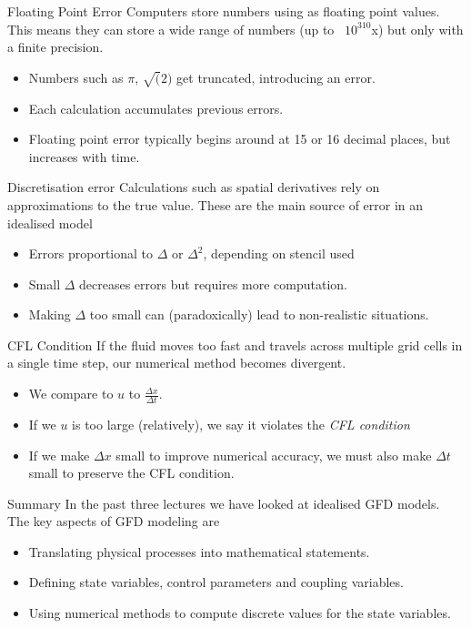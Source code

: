 \documentclass[a4paper]{beamer}
\begin{document}
\begin{frame}{Floating Point Error}
Computers store numbers using as floating point values. This means they can store a wide range of numbers (up to ~$10^310$x) but only with a finite precision.
\begin{itemize}
\item Numbers such as $\pi$, $\sqrt(2)$ get truncated, introducing an error.
\item Each calculation accumulates previous errors.
\item Floating point error typically begins around at 15 or 16 decimal places, but increases with time.
\end{itemize}
\end{frame}

\begin{frame}{Discretisation error}
Calculations such as spatial derivatives rely on approximations to the true value.
These are the main source of error in an idealised model
\begin{itemize}
\item Errors proportional to $\Delta$ or $\Delta^2$, depending on stencil used
\item Small $\Delta$ decreases errors but requires more computation.
\item Making $\Delta$ too small can (paradoxically) lead to non-realistic situations.
\end{itemize}
\end{frame}

\begin{frame}{CFL Condition}
If the fluid moves too fast and travels across multiple grid cells in a single time step, our numerical method becomes divergent.
\begin{itemize}
\item We compare to $u$ to $\frac{\Delta x}{\Delta t}$.
\item If we $u$ is too large (relatively), we say it violates the \emph{CFL condition}
\item If we make $\Delta x$ small to improve numerical accuracy, we must also make $\Delta t$ small to preserve the CFL condition.
\end{itemize}
\end{frame}

\begin{frame}{Summary}
In the past three lectures we have looked at idealised GFD models.
The key aspects of GFD modeling are
\begin{itemize}
\item Translating physical processes into mathematical statements.
\item Defining state variables, control parameters and coupling variables.
\item Using numerical methods to compute discrete values for the state variables.
\end{itemize}
\end{frame}
\end{document}
